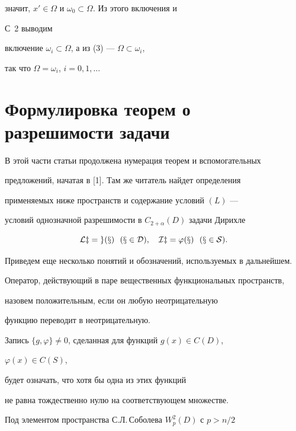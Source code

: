 значит, $x'\in\Omega$ и $\omega_0\subset\Omega$. Из этого включения и


С~2 выводим 


включение $\omega_i\subset\Omega$, а из (3) --- $\Omega\subset\omega_i$, 


так что $\Omega=\omega_i$, $i=0,1,\dotsc$ 


 


\section{Формулировка теорем о разрешимости задачи} 


 


В этой части статьи продолжена нумерация теорем и вспомогательных 


предложений, начатая в [1]. Там же читатель найдет определения 


применяемых ниже пространств и содержание условий $(L)$ --- 


условий однозначной разрешимости в $C_{2+\alpha}(D)$ задачи Дирихле 


\begin{equation} 


\cal L z=g(x)\ \ (x\in D),\quad I z=\varphi(x) \ \ (x\in S). 


\end{equation} 


Приведем еще несколько понятий и обозначений, используемых в дальнейшем. 


 


Оператор, действующий в паре вещественных функциональных пространств,


назовем положительным, если он любую неотрицательную 


функцию переводит в неотрицательную. 


 


Запись $\{g,\varphi\}\ne0$, сделанная для функций $g(x)\in C(D)$, 


$\varphi(x)\in C(S)$, 


будет означать, что хотя бы одна из этих функций 


не равна тождественно нулю на соответствующем множестве. 


 


Под элементом пространства С.Л.\,Соболева $W^2_p(D)$ с $p>n/2$ 


